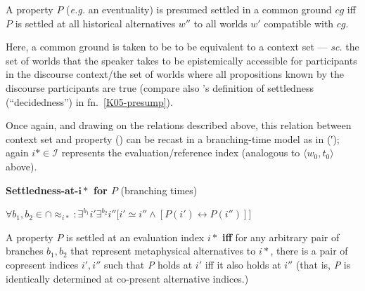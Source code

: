 \documentclass[12pt,dvipsnames]{report}
\begin{document}
A property $P$ (\textit{e.g.} an eventuality) is presumed settled in a common ground $cg$ iff $P$ is settled at all historical alternatives $ w'' $ to all worlds $ w' $ compatible with $ cg $.

Here, a common ground is taken to be to be equivalent to a context set \citep[$ \cap\textit{cg} $, \textit{cf.}][321\textit{ff}]{Stalnaker1978} --- \textit{sc. }the set of worlds that the speaker takes to be epistemically accessible for participants in the discourse context/the set of worlds where all propositions known by the discourse participants are true (compare also \citeauthor{Kaufmann2005}'s definition of settledness (``decidedness'') in fn.~\ref{K05-presump}).
\xe

Once again, and drawing on the relations described above, this relation between context set and property () can be recast in a branching-time model as in (′); again $ i*\in\mathcal I $ represents the evaluation/reference index (analogous to $ \langle w_0,t_0\rangle $ above).

\pex[exno=\getref{HistNec}′]\textbf{Settledness-at-$ \boldsymbol{i*} $ for $ \boldsymbol{\mathit P} $} (branching times)





\nobreak$\forall b_1,b_2\in\cap{\approx_{i*}}:\exists^{b_1}i'\exists^{b_2}i''\big[i'\simeq i''\wedge [P(i')\leftrightarrow P(i'')]\big]$

\nobreak A property $ P $ is settled at an evaluation index $ i* $ \textbf{iff} for any arbitrary pair of branches $ b_1,b_2 $ that represent metaphysical alternatives to $ i* $, there is a pair of copresent indices $ i',i'' $ such that \textit{P} holds at $ i' $ iff it also holds at $ i'' $ (that is, \textit{P} is identically determined at co-present alternative indices.)
\end{document}

